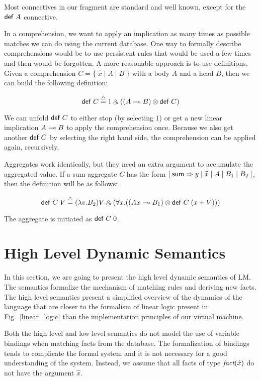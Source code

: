 Most connectives in our fragment are standard and well known, except for the $\mathsf{def} \; A$ connective.

In a comprehension, we want to apply an implication as many times as possible matches we can do
using the current database. One way to formally describe comprehensions would be to use persistent
rules that would be used a few times and then would be forgotten. A more reasonable approach is to use
definitions. Given a comprehension $C = \{ \; \widehat{x} \; | \; A \; | \; B \; \}$ with a body $A$ and a head $B$, then we can build the following definition:

\[
\compr{C} \defeq 1 \with ((A \lolli B) \otimes \compr{C})
\]

We can unfold $\mathsf{def} \; C$ to either stop (by selecting $1$) or get a new linear implication $A \multimap B$
to apply the comprehension once. Because we also get another $\mathsf{def} \; C$ by selecting the right hand side,
the comprehension can be applied again, recursively.

Aggregates work identically, but they need an extra argument to accumulate the aggregated value. If a sum aggregate $C$ has the form $[\;\mathsf{sum} \Rightarrow y \; | \; \widehat{x} \; | \; A \; | \; B_1 \; | \; B_2 \;]$, then the definition will be as follows:

\[
\compr{C} \; V \defeq (\lambda v. B_2)V \with (\forall x. ((Ax \lolli B_1) \otimes \compr{C} \; (x + V)))
\]

The aggregate is initiated as $\mathsf{def} \; C \; 0$.

\section{High Level Dynamic Semantics}

In this section, we are going to present the high level dynamic semantics of LM. The semantics
formalize the mechanism of matching rules and deriving new facts. The high level semantics
present a simplified overview of the dynamics of the language that are closer to the formalism
of linear logic present in Fig.~\ref{linear_logic} than the implementation principles of our
virtual machine.

Both the high level and low level semantics do not model the use of variable bindings when matching
facts from the database. The formalization of bindings tends to complicate the formal system and it is not
necessary for a good understanding of the system. Instead, we assume that all facts of
type $\emph{fact}(\hat{x})$ do not have the argument $\hat{x}$.

